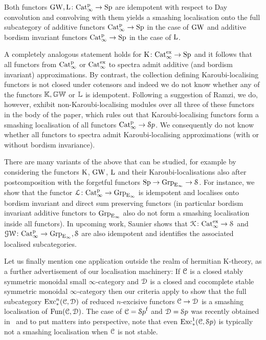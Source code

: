 \begin{propositionintrofour}
\label{proposition:intro-J}%
Both functors $\operatorname{GW},\operatorname L \colon \mathrm{Cat}^{\mathrm p}_\infty \to \mathrm{Sp}$ are idempotent with respect to Day convolution and convolving with them yields a smashing localisation onto the full subcategory of additive functors $\mathrm{Cat}^{\mathrm p}_\infty \to \mathrm{Sp}$ in the case of $\operatorname{GW}$ and additive bordism invariant functors $\mathrm{Cat}^{\mathrm p}_\infty \rightarrow \mathrm{Sp}$ in the case of $\operatorname L$. %
\end{propositionintrofour}


A completely analogous statement holds for $\operatorname K \colon \mathrm{Cat}_\infty^{\mathrm{ex}} \rightarrow \mathrm{Sp}$
and it follows that all functors from $\mathrm{Cat}^{\mathrm p}_\infty$ or $\mathrm{Cat}_\infty^{\mathrm{ex}}$ to spectra admit additive (and bordism invariant) approximations. By contrast, the collection defining Karoubi-localising functors is not closed under cotensors and indeed we do not know whether any of the functors $\mathbb K, \mathbb{GW}$ or $\mathbb{L}$ is idempotent. Following a suggestion of Ramzi, we do, however, exhibit non-Karoubi-localising modules over all three of these functors in the body of the paper, which rules out that Karoubi-localising functors form a smashing localisation of all functors $\mathrm{Cat}^{\mathrm p}_\infty \rightarrow {\mathcal Sp}$. We consequently do not know whether all functors to spectra admit Karoubi-localising approximations (with or without bordism invariance).

There are many variants of the above that can be studied, for example by considering the functors $\operatorname K$, $\operatorname{GW}$, $\operatorname L$ and their Karoubi-localisations also after postcomposition with the forgetful functors $\mathrm{Sp} \to \operatorname{Grp}_{{\mathrm{E}_{\infty}}} \to \mathcal S$. For instance, we show that the functor $\operatorname{\mathcal{L}}\colon\mathrm{Cat}^{\mathrm p}_\infty \to \operatorname{Grp}_{{\mathrm{E}_{\infty}}}$ is idempotent and localises onto bordism invariant and direct sum preserving functors (in particular bordism invariant additive functors to $\operatorname{Grp}_{{\mathrm{E}_{\infty}}}$ also do not form a smashing localisation inside all functors). In upcoming work, Saunier shows that $\operatorname{\mathcal{K}}\colon \mathrm{Cat}_\infty^{\mathrm{ex}} \to \mathcal S$ and $\operatorname{\mathcal{GW}}\colon \mathrm{Cat}^{\mathrm p}_\infty \to \operatorname{Grp}_{{\mathrm{E}_{\infty}}},\mathcal S$ are also idempotent and identifies the associated localised subcategories.



Let us finally mention one application outside the realm of hermitian K-theory, as a further advertisement of our localisation machinery: If $\mathcal C$ is a closed stably symmetric monoidal small $\infty$-category and $\mathcal{D}$ is a %
closed and cocomplete stable symmetric monoidal $\infty$-category then our criteria apply to show that the full subcategory $\mathrm{Exc}^n_*(\mathcal C,\mathcal{D})$ of reduced $n$-excisive functors $\mathcal C \to \mathcal{D}$ is a smashing localisation of $\operatorname{Fun}(\mathcal C,\mathcal{D})$. The case of $\mathcal C={\mathcal Sp}^{\mathrm{f}}$ and $\mathcal{D}={\mathcal Sp}$ was recently obtained in~\cite{ABHS} and to put matters into perspective, note that even $\mathrm{Exc}^1_*(\mathcal C,{\mathcal Sp})$ is typically not a smashing localisation when $\mathcal C$ is not stable. %





